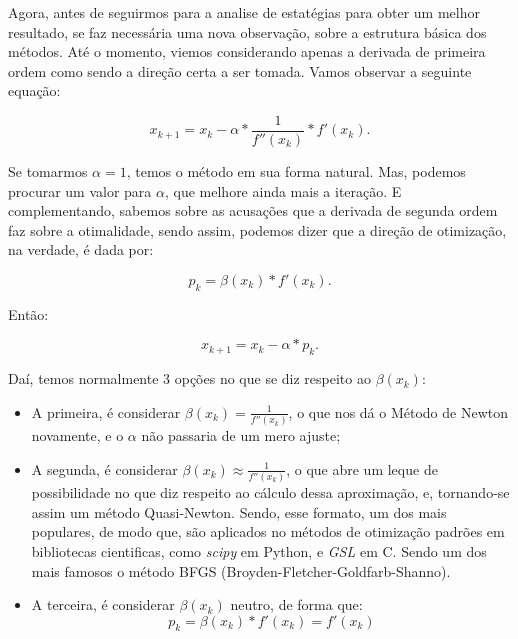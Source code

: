 Agora, antes de seguirmos para a analise de estatégias para obter um melhor
resultado, se faz necessária uma nova observação, sobre a estrutura básica
dos métodos. Até o momento, viemos considerando apenas a derivada de primeira
ordem como sendo a direção certa a ser tomada. Vamos observar a seguinte
equação:

\begin{equation}
    x_{k+1} = x_{k} - \alpha * \frac{1}{f''(x_k)} * f'(x_k).
\end{equation}

Se tomarmos \(\alpha = 1\), temos o método em sua forma natural. Mas,
podemos procurar um valor para \(\alpha\), que melhore ainda mais a iteração.
E complementando, sabemos sobre as acusações que a derivada de segunda ordem
faz sobre a otimalidade, sendo assim, podemos dizer que a direção de otimização,
na verdade, é dada por:

\begin{equation}
    p_k = \beta(x_k) * f'(x_k).
\end{equation}

Então:

\begin{equation}
    x_{k+1} = x_{k} - \alpha * p_{k}.
\end{equation}


Daí, temos normalmente 3 opções no que se diz respeito ao \(\beta(x_k)\):

\begin{itemize}

    \item A primeira, é considerar \(\beta(x_k) = \frac{1}{f''(x_k)}\), o que
        nos dá o Método de Newton novamente, e o \(\alpha\) não passaria de
        um mero ajuste;

    \item A segunda, é considerar
        \(\beta(x_k) \approx \frac{1}{f''(x_k)}\), o que abre um leque de
        possibilidade no que diz respeito ao cálculo dessa aproximação,
        e, tornando-se assim um método Quasi-Newton. Sendo, esse formato, um dos
        mais populares, de modo que, são aplicados no métodos de otimização
        padrões em bibliotecas cientificas, como \textit{scipy} em Python,
        e \textit{GSL} em C. Sendo um dos mais famosos o método BFGS
        (Broyden-Fletcher-Goldfarb-Shanno).

    \item A terceira, é considerar \(\beta(x_k) \) neutro, de forma que:
        \begin{equation}
            p_k = \beta(x_k) * f'(x_k) = f'(x_k)
        \end{equation}

\end{itemize}

